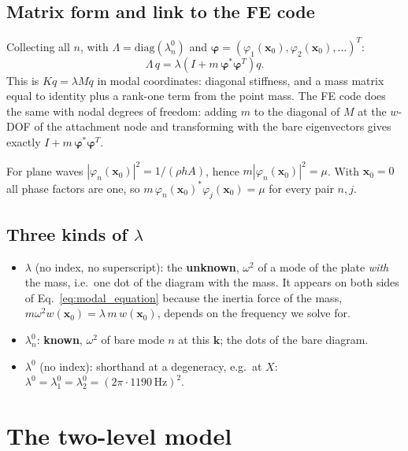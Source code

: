 \subsection{Matrix form and link to the FE code}
Collecting all $n$, with $\Lambda = \mathrm{diag}(\lambda_n^0)$ and
$\boldsymbol{\varphi} = (\varphi_1(\mathbf{x}_0), \varphi_2(\mathbf{x}_0), \dots)^T$:
\begin{equation}
  \Lambda\, q = \lambda \left( I + m\, \boldsymbol{\varphi}^*\boldsymbol{\varphi}^T \right) q .
\end{equation}
This is $K q = \lambda M q$ in modal coordinates: diagonal stiffness, and a
mass matrix equal to identity plus a rank-one term from the point mass. The FE
code does the same with nodal degrees of freedom: adding $m$ to the diagonal
of $M$ at the $w$-DOF of the attachment node and transforming with the bare
eigenvectors gives exactly $I + m\,\boldsymbol{\varphi}^*\boldsymbol{\varphi}^T$.

For plane waves $|\varphi_n(\mathbf{x}_0)|^2 = 1/(\rho h A)$, hence
$m|\varphi_n(\mathbf{x}_0)|^2 = \mu$. With $\mathbf{x}_0 = 0$ all phase
factors are one, so $m\, \varphi_n(\mathbf{x}_0)^* \varphi_j(\mathbf{x}_0) = \mu$
for every pair $n, j$.

\subsection{Three kinds of $\lambda$}
\begin{itemize}
  \item $\lambda$ (no index, no superscript): the \textbf{unknown}, $\omega^2$
        of a mode of the plate \emph{with} the mass, i.e.\ one dot of the
        diagram with the mass. It appears on both sides of
        Eq.~\eqref{eq:modal_equation} because the inertia force of the mass,
        $m\omega^2 w(\mathbf{x}_0) = \lambda\, m\, w(\mathbf{x}_0)$, depends on
        the frequency we solve for.
  \item $\lambda_n^0$: \textbf{known}, $\omega^2$ of bare mode $n$ at this
        $\mathbf{k}$; the dots of the bare diagram.
  \item $\lambda^0$ (no index): shorthand at a degeneracy, e.g.\ at $X$:
        $\lambda^0 = \lambda_1^0 = \lambda_2^0 = (2\pi\cdot 1190\,\mathrm{Hz})^2$.
\end{itemize}

\section{The two-level model}

